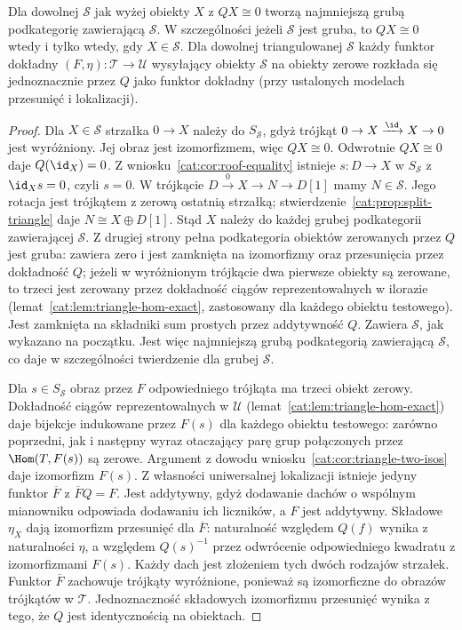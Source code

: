 \begin{stwierdzenie}\label{cat:prop:verdier-universal}
Dla dowolnej $\mathcal S$ jak wyżej obiekty $X$ z $QX\cong0$ tworzą najmniejszą grubą podkategorię zawierającą $\mathcal S$. W szczególności jeżeli $\mathcal S$ jest gruba, to $QX\cong0$ wtedy i tylko wtedy, gdy $X\in\mathcal S$. Dla dowolnej triangulowanej $\mathcal S$ każdy funktor dokładny $(F,\eta):\mathcal T\to\mathcal U$ wysyłający obiekty $\mathcal S$ na obiekty zerowe rozkłada się jednoznacznie przez $Q$ jako funktor dokładny (przy ustalonych modelach przesunięć i lokalizacji).
\end{stwierdzenie}
\begin{proof}
Dla $X\in\mathcal S$ strzałka $0\to X$ należy do $S_{\mathcal S}$, gdyż trójkąt $0\to X\xrightarrow{\id}X\to0$ jest wyróżniony. Jej obraz jest izomorfizmem, więc $QX\cong0$. Odwrotnie $QX\cong0$ daje $Q(\id_X)=0$. Z wniosku~\ref{cat:cor:roof-equality} istnieje $s:D\to X$ w $S_{\mathcal S}$ z $\id_Xs=0$, czyli $s=0$. W trójkącie $D\xrightarrow{0}X\to N\to D[1]$ mamy $N\in\mathcal S$. Jego rotacja jest trójkątem z zerową ostatnią strzałką; stwierdzenie~\ref{cat:prop:split-triangle} daje $N\cong X\oplus D[1]$. Stąd $X$ należy do każdej grubej podkategorii zawierającej $\mathcal S$. Z drugiej strony pełna podkategoria obiektów zerowanych przez $Q$ jest gruba: zawiera zero i jest zamknięta na izomorfizmy oraz przesunięcia przez dokładność $Q$; jeżeli w wyróżnionym trójkącie dwa pierwsze obiekty są zerowane, to trzeci jest zerowany przez dokładność ciągów reprezentowalnych w ilorazie (lemat~\ref{cat:lem:triangle-hom-exact}, zastosowany dla każdego obiektu testowego). Jest zamknięta na składniki sum prostych przez addytywność $Q$. Zawiera $\mathcal S$, jak wykazano na początku. Jest więc najmniejszą grubą podkategorią zawierającą $\mathcal S$, co daje w szczególności twierdzenie dla grubej $\mathcal S$.

Dla $s\in S_{\mathcal S}$ obraz przez $F$ odpowiedniego trójkąta ma trzeci obiekt zerowy. Dokładność ciągów reprezentowalnych w $\mathcal U$ (lemat~\ref{cat:lem:triangle-hom-exact}) daje bijekcje indukowane przez $F(s)$ dla każdego obiektu testowego: zarówno poprzedni, jak i następny wyraz otaczający parę grup połączonych przez $\Hom(T,F(s))$ są zerowe. Argument z dowodu wniosku~\ref{cat:cor:triangle-two-isos} daje izomorfizm $F(s)$. Z własności uniwersalnej lokalizacji istnieje jedyny funktor $\overline F$ z $\overline FQ=F$. Jest addytywny, gdyż dodawanie dachów o wspólnym mianowniku odpowiada dodawaniu ich liczników, a $F$ jest addytywny. Składowe $\eta_X$ dają izomorfizm przesunięć dla $\overline F$: naturalność względem $Q(f)$ wynika z naturalności $\eta$, a względem $Q(s)^{-1}$ przez odwrócenie odpowiedniego kwadratu z izomorfizmami $F(s)$. Każdy dach jest złożeniem tych dwóch rodzajów strzałek. Funktor $\overline F$ zachowuje trójkąty wyróżnione, ponieważ są izomorficzne do obrazów trójkątów w $\mathcal T$. Jednoznaczność składowych izomorfizmu przesunięć wynika z tego, że $Q$ jest identycznością na obiektach.
\end{proof}

